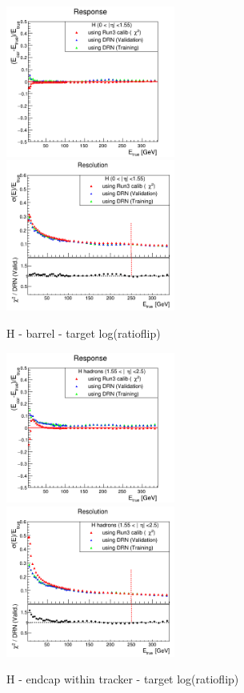 \begin{figure}
\includegraphics[width=0.495\textwidth]{./plots_pdf/HCAL_plots/Trained_target_ratioflip_0_500_10/pdf/H_barrel/barrel_corrEtaBarrelHcal.png}
\includegraphics[width=0.495\textwidth]{./plots_pdf/HCAL_plots/Trained_target_ratioflip_0_500_10/pdf/H_barrel/barrel_corrEtaBarrelHcal_reso.png}
\caption{H - barrel - target log(ratioflip)}
\end{figure}


\begin{figure}
\includegraphics[width=0.495\textwidth]{./plots_pdf/HCAL_plots/Trained_target_ratioflip_0_500_10/pdf/H_ec_in/EC_within_tracker_corrEtaEndcapHcal.png}
\includegraphics[width=0.495\textwidth]{./plots_pdf/HCAL_plots/Trained_target_ratioflip_0_500_10/pdf/H_ec_in/EC_within_tracker_corrEtaEndcapHcal_reso.png}
\caption{H - endcap within tracker - target log(ratioflip)}
\end{figure}


